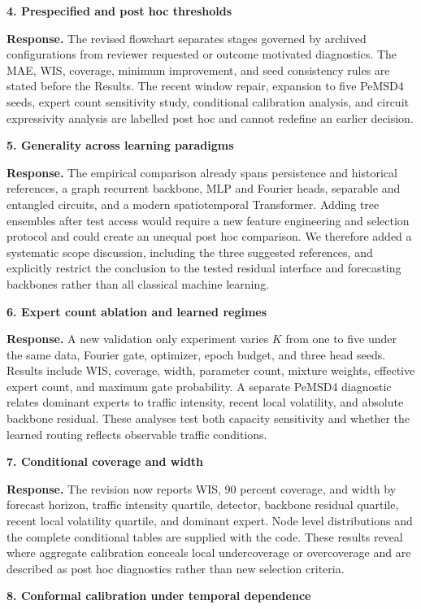 \documentclass[11pt]{article}
\newcommand{\response}[1]{\textbf{Response.} #1}
\begin{document}
\textbf{4. Prespecified and post hoc thresholds}

\response{The revised flowchart separates stages governed by archived configurations from reviewer requested or outcome motivated diagnostics. The MAE, WIS, coverage, minimum improvement, and seed consistency rules are stated before the Results. The recent window repair, expansion to five PeMSD4 seeds, expert count sensitivity study, conditional calibration analysis, and circuit expressivity analysis are labelled post hoc and cannot redefine an earlier decision.}

\textbf{5. Generality across learning paradigms}

\response{The empirical comparison already spans persistence and historical references, a graph recurrent backbone, MLP and Fourier heads, separable and entangled circuits, and a modern spatiotemporal Transformer. Adding tree ensembles after test access would require a new feature engineering and selection protocol and could create an unequal post hoc comparison. We therefore added a systematic scope discussion, including the three suggested references, and explicitly restrict the conclusion to the tested residual interface and forecasting backbones rather than all classical machine learning.}

\textbf{6. Expert count ablation and learned regimes}

\response{A new validation only experiment varies $K$ from one to five under the same data, Fourier gate, optimizer, epoch budget, and three head seeds. Results include WIS, coverage, width, parameter count, mixture weights, effective expert count, and maximum gate probability. A separate PeMSD4 diagnostic relates dominant experts to traffic intensity, recent local volatility, and absolute backbone residual. These analyses test both capacity sensitivity and whether the learned routing reflects observable traffic conditions.}

\textbf{7. Conditional coverage and width}

\response{The revision now reports WIS, 90 percent coverage, and width by forecast horizon, traffic intensity quartile, detector, backbone residual quartile, recent local volatility quartile, and dominant expert. Node level distributions and the complete conditional tables are supplied with the code. These results reveal where aggregate calibration conceals local undercoverage or overcoverage and are described as post hoc diagnostics rather than new selection criteria.}

\textbf{8. Conformal calibration under temporal dependence}
\end{document}
